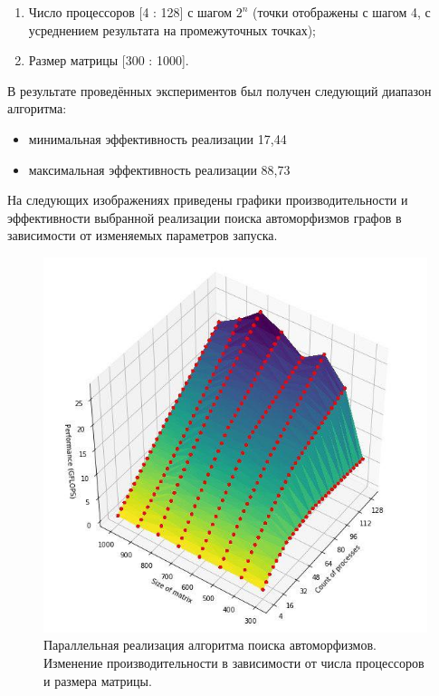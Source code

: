 \begin{enumerate}
\item Число процессоров [4 : 128] с шагом $ 2^n$ (точки отображены с шагом 4, с усреднением результата на промежуточных точках);
\item Размер матрицы [300 : 1000].
\end{enumerate}

В результате проведённых экспериментов был получен следующий диапазон алгоритма:

\begin{itemize}
\item минимальная эффективность реализации 17,44%
\item максимальная эффективность реализации 88,73%
\end{itemize}

На следующих изображениях приведены графики производительности и эффективности выбранной реализации поиска автоморфизмов графов в зависимости от изменяемых параметров запуска.

\begin{figure}[ht]
\centering 
    \includegraphics[scale=0.8]{image/p.jpg}
    \caption{Параллельная реализация алгоритма поиска автоморфизмов. Изменение производительности в зависимости от числа процессоров и размера матрицы.}
    \label{srg}
\end{figure}

